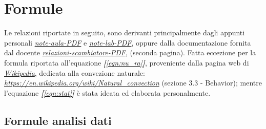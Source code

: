 \documentclass[a4paper,10pt]{article}                                                                                       %
\begin{document}
\section{Formule}                                                                                                           %
\label{sec:formulas}                                                                                                        %
  Le relazioni riportate in seguito, sono derivanti principalmente dagli appunti personali
  \textit{\href{https://github.com/CristianMerli/DataAnalysis/blob/master/lab_doc/NoteAula.pdf}{note-aula-PDF}} e
  \textit{\href{https://github.com/CristianMerli/DataAnalysis/blob/master/lab_doc/Note.pdf}{note-lab-PDF}},
  oppure dalla documentazione fornita dal docente
  \textit{\href{https://github.com/CristianMerli/DataAnalysis/blob/master/lab_doc/RelazioniScambiatore.pdf}{relazioni-scambiatore-PDF}},
  (seconda pagina). Fatta eccezione per la formula riportata all'equazione \textit{\textbf{[}\ref{eqn:nu_ra}\textbf{]}},
  proveniente dalla pagina web di
  \textit{\href{https://en.wikipedia.org/}{Wikipedia}}, dedicata alla convezione naturale:
  \textit{\href{https://en.wikipedia.org/wiki/Natural_convection}{https://en.wikipedia.org/wiki/Natural\_convection}}
  (sezione 3.3 - Behavior); mentre l'equazione \textit{\textbf{[}\ref{eqn:stat}\textbf{]}} è stata ideata ed elaborata
  personalmente.
\subsection{Formule analisi dati}                                                                                           %
\label{subsec:da_formulas}                                                                                                  %
\end{document}
